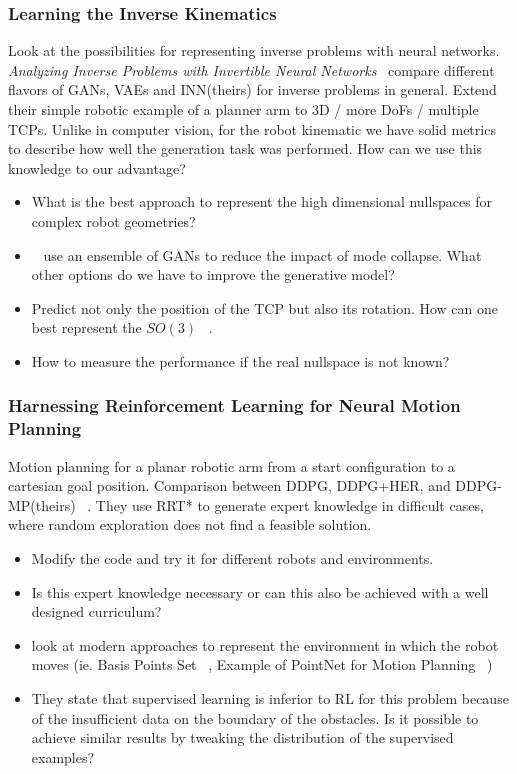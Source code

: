 \documentclass[a4paper]{article}
\begin{document}
\subsubsection{Learning the Inverse Kinematics}
Look at the possibilities for representing inverse problems with neural networks.
\textit{Analyzing Inverse Problems with Invertible Neural Networks}~\cite{Ardizzone2018}
compare different flavors of GANs, VAEs and INN(theirs) for inverse problems in general.
Extend their simple robotic example of a planner arm to 3D / more DoFs / multiple TCPs.
Unlike in computer vision, for the robot kinematic we have solid metrics to describe how well the generation task was performed.
How can we use this knowledge to our advantage?

\begin{itemize}
  \item What is the best approach to represent the high dimensional nullspaces for complex robot geometries?
  \item ~\cite{Lembono2021} use an ensemble of GANs to reduce the impact of mode collapse.
        What other options do we have to improve the generative model?
  \item Predict not only the position of the TCP but also its rotation.
        How can one best represent the $SO(3)$ ~\cite{Zhou2018}.
  \item How to measure the performance if the real nullspace is not known?
\end{itemize}

\subsubsection{Harnessing Reinforcement Learning for Neural Motion Planning}
Motion planning for a planar robotic arm from a start configuration to a cartesian goal position.
Comparison between DDPG, DDPG+HER, and DDPG-MP(theirs) ~\cite{Jurgenson2019}.
They use RRT* to generate expert knowledge in difficult cases, where random exploration does not find a feasible solution.
\begin{itemize}
  \item Modify the code and try it for different robots and environments.
  \item Is this expert knowledge necessary or can this also be achieved with a well designed curriculum?
  \item look at modern approaches to represent the environment in which the robot moves (ie. Basis Points Set ~\cite{Prokudin2019}, Example of PointNet for Motion Planning ~\cite{Strudel2020})
  \item They state that supervised learning is inferior to RL for this problem because of the insufficient data on the boundary of the obstacles. Is it possible to achieve similar results by tweaking the distribution of the supervised examples?
\end{itemize}
\end{document}
